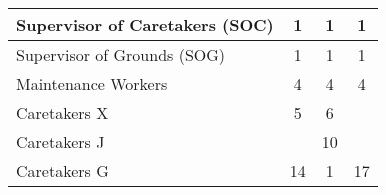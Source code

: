 \begin{tabular}{l|c|c|c|}
        \multicolumn{1}{|l|}{\cellcolor{ccfuschialight}Supervisor of Caretakers (SOC)} & 1                                                      & 1                                                                & 1                                                      \\ \hline
        \multicolumn{1}{|l|}{\cellcolor{ccfuschialight}Supervisor of Grounds (SOG)}    & 1                                                      & 1                                                                & 1                                                      \\ \hline
        \multicolumn{1}{|l|}{\cellcolor{ccfuschialight}Maintenance Workers}            & 4                                                      & 4                                                                & 4                                                       \\ \hline
        \multicolumn{1}{|l|}{\cellcolor{ccfuschialight}Caretakers X}                   & 5                                                      & 6                                                                &                                                       \\ \cline{1-3}
        \multicolumn{1}{|l|}{\cellcolor{ccfuschialight}Caretakers J\tnote{2}}                   &                                                       & 10                                                                &                                                         \\ \cline{1-1} \cline{3-3}
        \multicolumn{1}{|l|}{\cellcolor{ccfuschialight}Caretakers G}                   & \multirow{-2}{*}{14}                                                      & 1                                     & \multirow{-3}{*}{17 \tnote{3}}                           \\ \hline
        \end{tabular}
        
        
